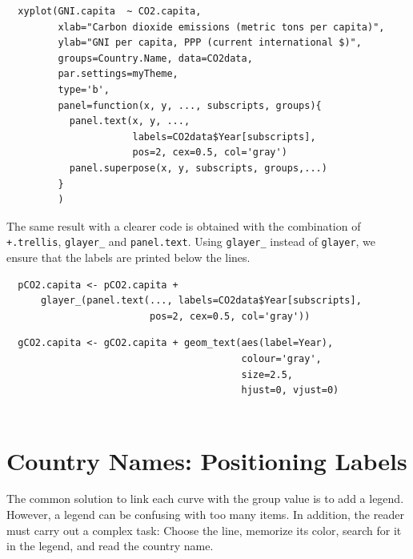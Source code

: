  

\lstset{language=r,label= ,caption= ,captionpos=b,numbers=none}
\begin{lstlisting}
  xyplot(GNI.capita  ~ CO2.capita,
         xlab="Carbon dioxide emissions (metric tons per capita)",
         ylab="GNI per capita, PPP (current international $)",
         groups=Country.Name, data=CO2data,
         par.settings=myTheme,
         type='b', 
         panel=function(x, y, ..., subscripts, groups){
           panel.text(x, y, ...,
                      labels=CO2data$Year[subscripts],
                      pos=2, cex=0.5, col='gray')
           panel.superpose(x, y, subscripts, groups,...)
         }
         )
\end{lstlisting}

The same result with a clearer code is obtained with the combination
of \texttt{+.trellis}, \texttt{glayer\_} and \texttt{panel.text}. Using \texttt{glayer\_} instead of
\texttt{glayer}, we ensure that the labels are printed below the lines.


\lstset{language=r,label= ,caption= ,captionpos=b,numbers=none}
\begin{lstlisting}
  pCO2.capita <- pCO2.capita +
      glayer_(panel.text(..., labels=CO2data$Year[subscripts],
                         pos=2, cex=0.5, col='gray'))
\end{lstlisting}

\lstset{language=r,label= ,caption= ,captionpos=b,numbers=none}
\begin{lstlisting}
  gCO2.capita <- gCO2.capita + geom_text(aes(label=Year),
                                         colour='gray',
                                         size=2.5,
                                         hjust=0, vjust=0)
  
\end{lstlisting}

\section{Country Names: Positioning Labels}
\label{sec:org45c0d39}
The common solution to link each curve with the group value is to add
a legend. However, a legend can be confusing with too many items. In
addition, the reader must carry out a complex task: Choose the line,
memorize its color, search for it in the legend, and read the country
name.

